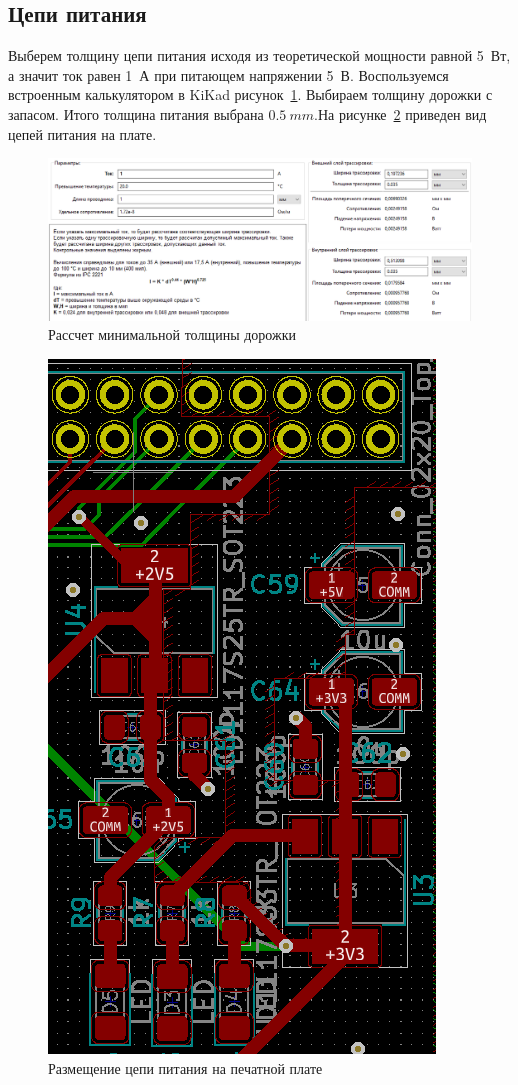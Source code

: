 \documentclass[utf8x, 14pt, oneside, a4paper]{article}
\begin{document}
		\subsection{Цепи питания}
		Выберем толщину цепи питания исходя из теоретической мощности равной 5~Вт, а значит ток равен 1~А при питающем напряжении 5~В. Воспользуемся встроенным калькулятором в KiKad рисунок~\ref{fig:Дорожка}. Выбираем толщину дорожки с запасом. Итого толщина питания выбрана $0.5~mm $.На рисунке~\ref{fig:Питание} приведен вид цепей питания на плате.
		\begin{figure}[h!]
			\centering
			\includegraphics[width=0.9\linewidth]{"Расчет минимальной толщины дорожки"}
			\caption{Рассчет минимальной толщины дорожки}
			\label{fig:Дорожка}
		\end{figure}
		 \begin{figure}[h!]
		 	\centering
		 	\includegraphics[width=0.3\linewidth]{"Система питания"}
		 	\caption{Размещение цепи питания на печатной плате}
		 	\label{fig:Питание}
		 \end{figure}
		 
\end{document}
